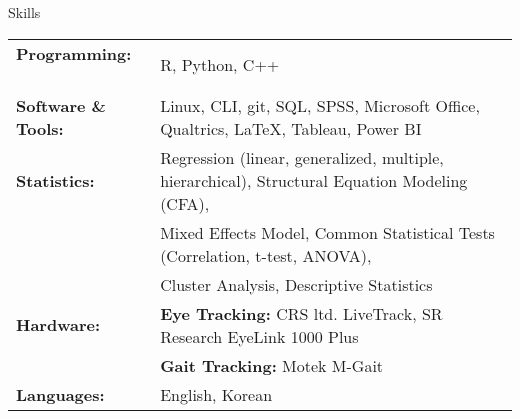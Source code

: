 \documentclass{resume} %
\begin{document}
%
%    
%        
%        
%        
%        
%    


\begin{rSection}{Skills}
    
    \begin{tabular}{ @{} >{\bfseries}l @{\hspace{3ex}} l }
        
        Programming: \ & R, Python, C++ \\%
        Software \& Tools: 
        & Linux, CLI, git, SQL, SPSS, Microsoft Office, Qualtrics, 
        \LaTeX, Tableau, Power BI\\
        Statistics: \ & Regression (linear, generalized, multiple, hierarchical), Structural Equation Modeling (CFA), \\
        \ & Mixed Effects Model, Common Statistical Tests (Correlation, t-test, 
        ANOVA), \\
        \ & Cluster Analysis, Descriptive Statistics \\
        Hardware: & {\textbf{Eye Tracking: }}CRS ltd. LiveTrack, SR Research 
        EyeLink 1000 Plus \\
        & {\textbf{Gait Tracking: }}Motek M-Gait \\
        Languages: \ &  English, Korean\\
        
    \end{tabular}
    
\end{rSection}

\end{document}
